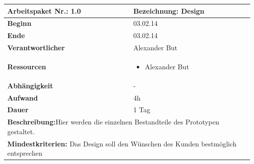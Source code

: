 \documentclass[fontsize=12pt,paper=a4,twoside]{scrartcl}
\begin{document}
\begin{verbatim} 
\end{verbatim}

\begin{tabular}{|p{5.3cm}|p{9.7cm}|}\hline
	\textbf{Arbeitspaket Nr.:} 1.0 & \textbf{Bezeichnung:} Design\\ \hline \hline
	\textbf{Beginn} & 03.02.14\\ \hline
	\textbf{Ende} & 03.02.14\\ \hline
	\textbf{Verantwortlicher} & Alexander But\\ \hline
	\textbf{Ressourcen} & \begin{itemize}
		\item Alexander But
	\end{itemize}    \\ \hline
	\textbf{Abhängigkeit} & -\\ \hline
	\textbf{Aufwand} & 4h\\ \hline
	\textbf{Dauer} & 1 Tag\\ \hline
	\multicolumn{2}{|p{15cm}|}{\textbf{Beschreibung:}Hier werden die einzelnen Bestandteile des Prototypen gestaltet.\newline   }\\ \hline
	\multicolumn{2}{|p{15cm}|}{\textbf{Mindestkriterien:} Das Design soll den Wünschen des Kunden bestmöglich entsprechen\newline }\\ \hline
	
\end{tabular}
\begin{verbatim} 

\end{verbatim}
\end{document}
